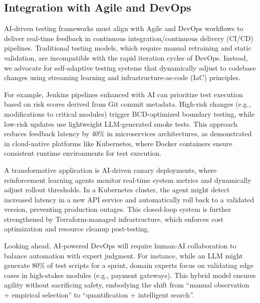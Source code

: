\documentclass[manuscript,screen,review]{acmart}
\begin{document}
\subsection{Integration with Agile and DevOps}
\label{subsec:7.2}

AI-driven testing frameworks must align with Agile and DevOps workflows to deliver real-time feedback in continuous integration/continuous delivery (CI/CD) pipelines. Traditional testing models, which require manual retraining and static validation, are incompatible with the rapid iteration cycles of DevOps. Instead, we advocate for self-adaptive testing systems that dynamically adjust to codebase changes using streaming learning and infrastructure-as-code (IaC) principles.

For example, Jenkins pipelines enhanced with AI can prioritize test execution based on risk scores derived from Git commit metadata. High-risk changes (e.g., modifications to critical modules) trigger BCD-optimized boundary testing, while low-risk updates use lightweight LLM-generated smoke tests. This approach reduces feedback latency by 40\% in microservices architectures, as demonstrated in cloud-native platforms like Kubernetes, where Docker containers ensure consistent runtime environments for test execution.

A transformative application is AI-driven canary deployments, where reinforcement learning agents monitor real-time system metrics and dynamically adjust rollout thresholds. In a Kubernetes cluster, the agent might detect increased latency in a new API service and automatically roll back to a validated version, preventing production outages. This closed-loop system is further strengthened by Terraform-managed infrastructure, which enforces cost optimization and resource cleanup post-testing.

Looking ahead, AI-powered DevOps will require human-AI collaboration to balance automation with expert judgment. For instance, while an LLM might generate 80\% of test scripts for a sprint, domain experts focus on validating edge cases in high-stakes modules (e.g., payment gateways). This hybrid model ensures agility without sacrificing safety, embodying the shift from ``manual observation + empirical selection'' to ``quantification + intelligent search''.

\vspace{2ex}
\end{document}
